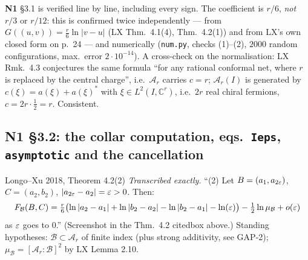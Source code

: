 \documentclass[11pt]{article}
\newcommand{\Ar}{\mathcal A_r}
\newcommand{\NI}{\textbf{N1}}
\newcommand{\loc}[1]{{\small\texttt{#1}}}
\newcommand{\1}{\mathbf 1}
\begin{document}
\begin{verdictok}
\NI{} \S3.1 is verified line by line, including every sign. The coefficient is $r/6$, \emph{not} $r/3$
or $r/12$: this is confirmed twice independently --- from $G((u,v))=\frac r6\ln|v-u|$
(LX Thm.~4.1(4), Thm.~4.2(1)) and from LX's own closed form on p.~24 --- and numerically
(\loc{num.py}, checks (1)--(2), $2000$ random configurations, max.\ error $2\cdot10^{-14}$).
A cross-check on the normalisation: LX Rmk.~4.3 conjectures the same formula ``for any rational
conformal net, where $r$ is replaced by the central charge'', i.e.\ $\Ar$ carries $c=r$;
$\Ar(I)$ is generated by $c(\xi)=a(\xi)+a(\xi)^*$ with $\xi\in L^2(I,\mathbb C^r)$, i.e.\ $2r$ real
chiral fermions, $c=2r\cdot\frac12=r$. Consistent.
\end{verdictok}

\subsection{N1 \S3.2: the collar computation, eqs.\ \loc{Ieps}, \loc{asymptotic} and the cancellation}

\begin{citedbox}{Longo--Xu 2018, Theorem 4.2(2)}
\emph{Transcribed exactly.} ``(2) Let $B=(a_1,a_{2\varepsilon})$, $C=(a_2,b_2)$, $|a_{2\varepsilon}-a_2|=\varepsilon>0$. Then:
\[F_{\mathcal B}(B,C)=\tfrac r6\bigl(\ln|a_2-a_1|+\ln|b_2-a_2|-\ln|b_2-a_1|-\ln(\varepsilon)\bigr)-\tfrac12\ln\mu_{\mathcal B}+o(\varepsilon)\]
as $\varepsilon$ goes to 0.'' (Screenshot in the Thm.~4.2 citedbox above.) Standing hypotheses:
$\mathcal B\subset\Ar$ of finite index (plus strong additivity, see GAP-2); $\mu_{\mathcal B}=[\Ar:\mathcal B]^2$ by LX Lemma 2.10.
\end{citedbox}
\end{document}
